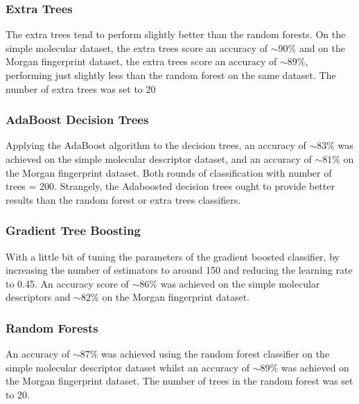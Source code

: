 \documentclass[a4paper,12pt]{report}
\begin{document}
				\subsubsection{Extra Trees}
				The extra trees tend to perform slightly better than the random forests. On the simple molecular dataset, the extra trees score an accuracy of $\sim90\%$ and on the Morgan fingerprint dataset, the extra trees score an accuracy of $\sim89\%$, performing just slightly less than the random forest on the same dataset. The number of extra trees was set to 20
				\subsubsection{AdaBoost Decision Trees}
				Applying the AdaBoost algorithm to the decision trees, an accuracy of $\sim83\%$ was achieved on the simple molecular descriptor dataset, and an accuracy of $\sim81\%$ on the Morgan fingerprint dataset. Both rounds of classification with number of trees = 200. Strangely, the Adaboosted decision trees ought to provide better results than the random forest or extra trees classifiers. 
				\subsubsection{Gradient Tree Boosting}
				With a little bit of tuning the parameters of the gradient boosted classifier, by increasing the number of estimators to around 150 and reducing the learning rate to 0.45. An accuracy score of $\sim86\%$ was achieved on the simple molecular descriptors and $\sim82\%$ on the Morgan fingerprint dataset.
				\subsubsection{Random Forests}
				An accuracy of $\sim87\%$ was achieved using the random forest classifier on the simple molecular descriptor dataset whilst an accuracy of $\sim89\%$ was achieved on the Morgan fingerprint dataset. The number of trees in the random forest was set to 20.
\end{document}
